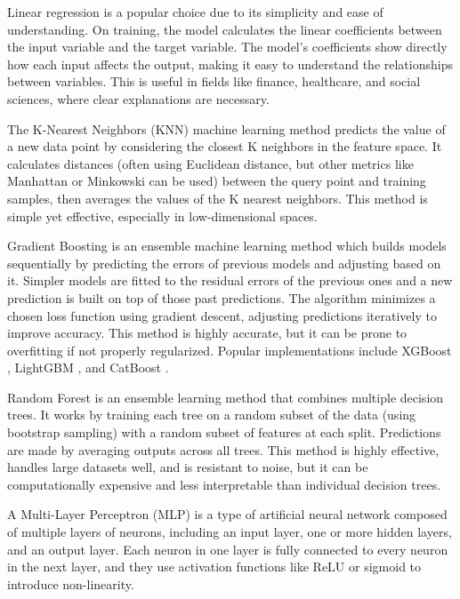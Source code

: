 \documentclass[12pt,a4paper]{book}
\begin{document}
Linear regression \citep{montgomery2012lrintroduction} is a popular choice due to its simplicity and ease of understanding. On training, the model calculates the linear coefficients between the input variable and the target variable. The model’s coefficients show directly how each input affects the output, making it easy to understand the relationships between variables. This is useful in fields like finance, healthcare, and social sciences, where clear explanations are necessary. 


The K-Nearest Neighbors (KNN) \citep{knnaltman_introduction_1992} machine learning method predicts the value of a new data point by considering the closest K neighbors in the feature space. It calculates distances (often using Euclidean distance, but other metrics like Manhattan or Minkowski can be used) between the query point and training samples, then averages the values of the K nearest neighbors. This method is simple yet effective, especially in low-dimensional spaces.

Gradient Boosting \citep{gradientfriedman_greedy_2001} is an ensemble machine learning method which builds models sequentially by predicting the errors of previous models and adjusting based on it. Simpler models are fitted to the residual errors of the previous ones and a new prediction is built on top of those past predictions. The algorithm minimizes a chosen loss function using gradient descent, adjusting predictions iteratively to improve accuracy. This method is highly accurate, but it can be prone to overfitting if not properly regularized. Popular implementations include XGBoost \citep{xgboostchen_xgboost:_2016}, LightGBM \citep{lightgbmke_lightgbm:_2017}, and CatBoost \citep{catboostprokhorenkova_catboost:_2018}.


Random Forest \citep{breiman_random_2001} is an ensemble learning method that combines multiple decision trees. It works by training each tree on a random subset of the data (using bootstrap sampling) with a random subset of features at each split. Predictions are made by averaging outputs across all trees. This method is highly effective, handles large datasets well, and is resistant to noise, but it can be computationally expensive and less interpretable than individual decision trees.

A Multi-Layer Perceptron (MLP) \citep{mlprumelhart_learning_1986} is a type of artificial neural network composed of multiple layers of neurons, including an input layer, one or more hidden layers, and an output layer. Each neuron in one layer is fully connected to every neuron in the next layer, and they use activation functions like ReLU or sigmoid to introduce non-linearity. 
\end{document}
